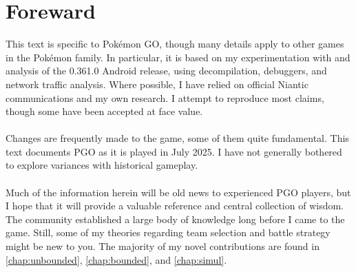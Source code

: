 \chapter{Foreward}

\noindent{}This text is specific to Pokémon GO, though many details
apply to other games in the Pokémon family.
In particular, it is based on my experimentation with and analysis of
 the 0.361.0 Android release, using decompilation, debuggers, and
 network traffic analysis.
Where possible, I have relied on official Niantic communications
 and my own research.
I attempt to reproduce most claims, though some have been accepted at face value.\\
\\
\noindent{}Changes are frequently made to the game, some of them quite fundamental.
This text documents PGO as it is played in July 2025.
I have not generally bothered to explore variances with historical gameplay.\\
\\
\noindent{}Much of the information herein will be old news to experienced
 PGO players, but I hope that it will provide a valuable reference and central collection of wisdom.
The community established a large body of knowledge long before I
 came to the game.
Still, some of my theories regarding team selection and battle strategy might
  be new to you.
The majority of my novel contributions are found in \autoref{chap:unbounded},
  \autoref{chap:bounded}, and \autoref{chap:simul}.
